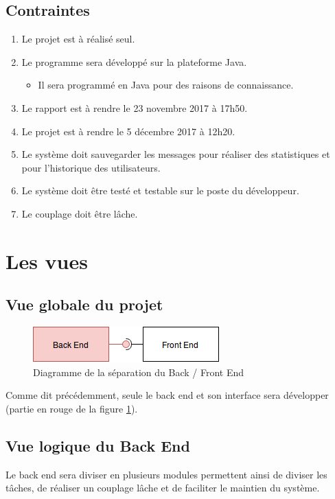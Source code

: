 \documentclass[12pt]{article}
\begin{document}
\subsection{Contraintes}
\begin{enumerate}
    \item Le projet est à réalisé seul.
    \item Le programme sera développé sur la plateforme Java.
    \begin{itemize}
        \item Il sera programmé en Java pour des raisons de connaissance.
    \end{itemize}
    \item Le rapport est à rendre le 23 novembre 2017 à 17h50.
    \item Le projet est à rendre le 5 décembre 2017 à 12h20.
    \item Le système doit sauvegarder les messages pour réaliser des statistiques et pour l'historique des utilisateurs.
    \item Le système doit être testé et testable sur le poste du développeur.
    \item Le couplage doit être lâche.
\end{enumerate}


\clearpage
\section{Les vues}
\subsection{Vue globale du projet}

\begin{figure}[h]
    \centering
    \includegraphics[]{img/Diagramme_sep_Back_Front.png}
    \caption{Diagramme de la séparation du Back / Front End}
    \label{fig:diag_back_front}
\end{figure}
Comme dit précédemment, seule le back end et son interface sera développer (partie en rouge de la figure \ref{fig:diag_back_front}).


\subsection{Vue logique du Back End}
Le back end sera diviser en plusieurs modules permettent ainsi de diviser les tâches, de réaliser un couplage lâche et de faciliter le maintien du système.
\end{document}
